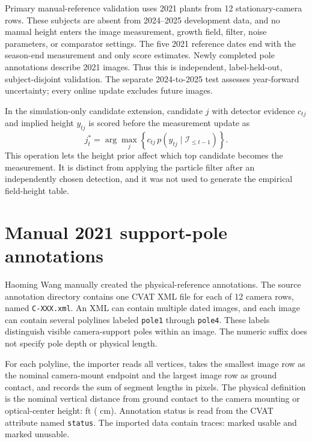 \documentclass[12pt,letterpaper]{article}
\begin{document}
Primary manual-reference validation uses 2021 plants from 12 stationary-camera rows. These subjects are absent from 2024--2025 development data, and no manual height enters the image measurement, growth field, filter, noise parameters, or comparator settings. The five 2021 reference dates end with the season-end measurement and only score estimates. Newly completed pole annotations describe 2021 images. Thus this is independent, label-held-out, subject-disjoint validation. The separate 2024-to-2025 test assesses year-forward uncertainty; every online update excludes future images.

In the simulation-only candidate extension, candidate $j$ with detector evidence $c_{tj}$ and implied height $y_{tj}$ is scored before the measurement update as
\begin{equation}
j_t^*=\arg\max_j\left\{c_{tj}\,p(y_{tj}\mid\mathcal I_{\leq t-1})\right\}.
\label{eq:s-candidate-score}
\end{equation}
This operation lets the height prior affect which top candidate becomes the measurement. It is distinct from applying the particle filter after an independently chosen detection, and it was not used to generate the empirical field-height table.

\section{Manual 2021 support-pole annotations}
\label{sec:s-support-poles}

Haoming Wang manually created the physical-reference annotations. The source annotation directory contains one CVAT XML file for each of 12 camera rows, named \texttt{C-XXX.xml}. An XML can contain multiple dated images, and each image can contain several polylines labeled \texttt{pole1} through \texttt{pole4}. These labels distinguish visible camera-support poles within an image. The numeric suffix does not specify pole depth or physical length.

For each polyline, the importer reads all vertices, takes the smallest image row as the nominal camera-mount endpoint and the largest image row as ground contact, and records the sum of segment lengths in pixels. The physical definition is the nominal vertical distance from ground contact to the camera mounting or optical-center height: \SupportPoleLengthFt{} ft (\SupportPoleLengthCm{} cm). Annotation status is read from the CVAT attribute named \texttt{status}. The imported data contain \ManualPoleAnnotations{} traces: \ManualPoleUsable{} marked usable and \ManualPoleUnusable{} marked unusable.
\end{document}
